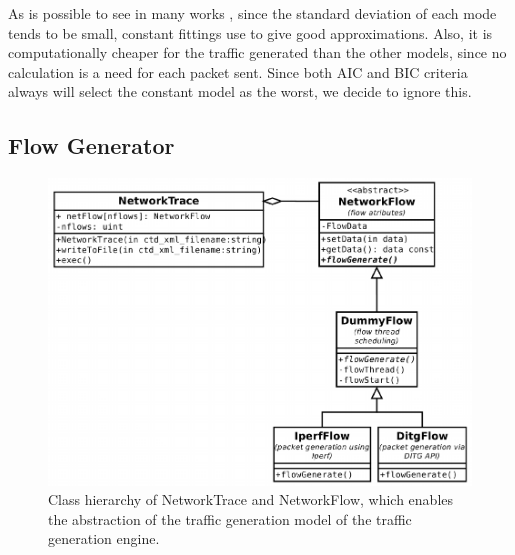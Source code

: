 As is possible to see in many works \cite{packet-distribution-model} \cite{udp-flows-model}, since the standard deviation of each mode tends to be small, constant fittings use to give good approximations. Also, it is computationally cheaper for the traffic generated than the other models, since no calculation is a need for each packet sent. Since both AIC and BIC criteria always will select the constant model as the worst, we decide to ignore this.




\subsection{Flow Generator}

\begin{figure}[ht!]
	\centering
	\includegraphics[width=\linewidth]{figures/trace-flow}
	\caption{Class hierarchy of NetworkTrace and NetworkFlow, which enables the abstraction of the traffic generation model of the traffic generation engine.}
	\label{fig:network-trace-flow-class-diagram}
\end{figure}

